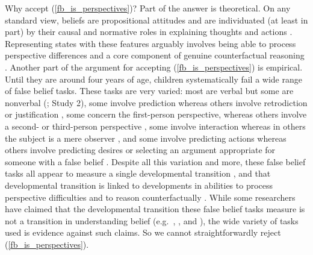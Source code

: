 \documentclass[12pt,\papersize]{extarticle}
\begin{document}
Why accept (\ref{fb_is_perspectives})?  
Part of the answer is theoretical. 
On any standard view, beliefs are propositional attitudes and are individuated (at least in part) by their causal and normative roles in explaining thoughts and actions \citep[]{Davidson:1980xp, Davidson:1990du}.
Representing states with these features arguably involves being able to process perspective differences and a core component of genuine counterfactual reasoning \citep{perner:2007_objects}. 
Another part of the argument for accepting (\ref{fb_is_perspectives}) is empirical.
Until they are around four years of age,
children systematically fail a wide range of false belief tasks.
These tasks are very varied: most are verbal but some are nonverbal (\citealp{Call:1999co}; \citealp{low:2010_preschoolers} Study 2),
some involve prediction whereas others involve retrodiction or justification \citep[e.g.][]{Wimmer:1998kx},
some concern the first-person perspective, whereas others involve a second- or third-person perspective \citep[e.g.][]{Gopnik:1991db},
some involve interaction whereas in others the subject is a mere observer \citep[e.g.][]{Chandler:1989qa},
and some involve predicting actions whereas others involve predicting desires \citep{Astington:1991kk} or selecting an argument appropriate for someone with a false belief \citep{Bartsch:2000es}. 
Despite all this variation and more, these false belief tasks all appear to measure a single developmental transition \citep{Wellman:2001lz},
and that developmental transition is linked to developments in abilities to process perspective difficulties \citep{Perner:2002jj} and to reason counterfactually \citep{rafetseder:2012_submitted}.
While some researchers have claimed that the developmental transition these false belief tasks measure is not a transition in understanding belief 
	(e.g.\ 
	\citealp[][p.\ 417]{Carpenter:2002gc},
	\citealp{Bloom:2000bt}, and
	\citealp{Leslie:1998nq}),
the wide variety of tasks used is evidence against such claims.
So we cannot straightforwardly reject  (\ref{fb_is_perspectives}).
\end{document}
